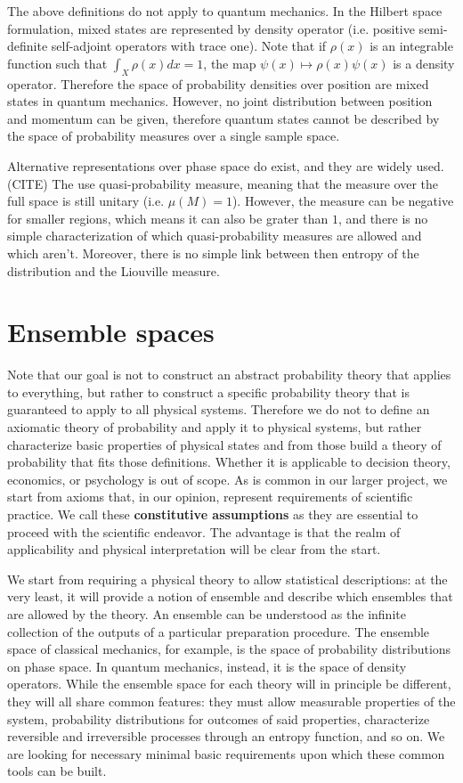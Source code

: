 \documentclass[10pt,twocolumn, nofootinbib]{revtex4-2}
\begin{document}
The above definitions do not apply to quantum mechanics. In the Hilbert space formulation, mixed states are represented by density operator (i.e. positive semi-definite self-adjoint operators with trace one). Note that if $\rho(x)$ is an integrable function such that $\int_X \rho(x) dx = 1$, the map $\psi(x) \mapsto \rho(x) \psi(x)$ is a density operator. Therefore the space of probability densities over position are mixed states in quantum mechanics. However, no joint distribution between position and momentum can be given, therefore quantum states cannot be described by the space of probability measures over a single sample space.

Alternative representations over phase space do exist, and they are widely used.(CITE) The use quasi-probability measure, meaning that the measure over the full space is still unitary (i.e. $\mu(M) =1$). However, the measure can be negative for smaller regions, which means it can also be grater than $1$, and there is no simple characterization of which quasi-probability measures are allowed and which aren't. Moreover, there is no simple link between then entropy of the distribution and the Liouville measure.

\section{Ensemble spaces}

Note that our goal is not to construct an abstract probability theory that applies to everything, but rather to construct a specific probability theory that is guaranteed to apply to all physical systems. Therefore we do not to define an axiomatic theory of probability and apply it to physical systems, but rather characterize basic properties of physical states and from those build a theory of probability that fits those definitions. Whether it is applicable to decision theory, economics, or psychology is out of scope. As is common in our larger project, we start from axioms that, in our opinion, represent requirements of scientific practice. We call these \textbf{constitutive assumptions} as they are essential to proceed with the scientific endeavor. The advantage is that the realm of applicability and physical interpretation will be clear from the start. 

We start from requiring a physical theory to allow statistical descriptions: at the very least, it will provide a notion of ensemble and describe which ensembles that are allowed by the theory. An ensemble can be understood as the infinite collection of the outputs of a particular preparation procedure. The ensemble space of classical mechanics, for example, is the space of probability distributions on phase space. In quantum mechanics, instead, it is the space of density operators. While the ensemble space for each theory will in principle be different, they will all share common features: they must allow measurable properties of the system, probability distributions for outcomes of said properties, characterize reversible and irreversible processes through an entropy function, and so on. We are looking for necessary minimal basic requirements upon which these common tools can be built.
\end{document}

